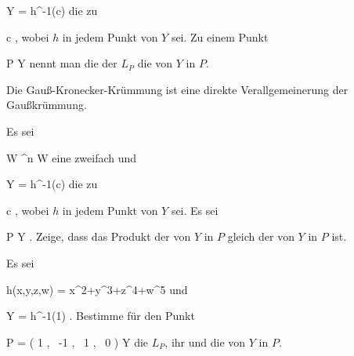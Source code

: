 \mavergleichskette
{\vergleichskette
{ Y
}
{ = }{ h^{-1}(c)
}
{  }{
}
{    }{
}
{   }{
}
}
{}{}{}
die
zu

\mavergleichskette
{\vergleichskette
{ c
}
{ \in }{ \R
}
{  }{
}
{    }{
}
{   }{
}
}
{}{}{,}
wobei $h$ in jedem Punkt von $Y$
sei. Zu einem Punkt

\mavergleichskette
{\vergleichskette
{ P
}
{ \in }{ Y
}
{  }{
}
{    }{
}
{   }{
}
}
{}{}{}
nennt man die
der
$L_P$ die
von $Y$ in $P$.

Die Gauß-Kronecker-Krümmung ist eine direkte Verallgemeinerung der Gaußkrümmung.

{}
{

Es sei

\mavergleichskette
{\vergleichskette
{ W
}
{ \subseteq }{ \R^n
}
{  }{
}
{    }{
}
{   }{
}
}
{}{}{}
 { W } { \R
} {}
eine zweifach
und

\mavergleichskette
{\vergleichskette
{ Y
}
{ = }{ h^{-1}(c)
}
{  }{
}
{    }{
}
{   }{
}
}
{}{}{}
die
zu

\mavergleichskette
{\vergleichskette
{ c
}
{ \in }{ \R
}
{  }{
}
{    }{
}
{   }{
}
}
{}{}{,}
wobei $h$ in jedem Punkt von $Y$
sei. Es sei

\mavergleichskette
{\vergleichskette
{ P
}
{ \in }{ Y
}
{  }{
}
{    }{
}
{   }{
}
}
{}{}{.}
Zeige, dass das Produkt der
von $Y$ in $P$ gleich der
von $Y$ in $P$ ist.

}
{} {}

{}
{

Es sei

\mavergleichskettedisp
{\vergleichskette
{ h(x,y,z,w)
}
{ =} { x^2+y^3+z^4+w^5
}
{ } {
}
{ } {
}
{ } {
}
}
{}{}{}
und

\mavergleichskette
{\vergleichskette
{ Y
}
{ = }{ h^{-1}(1)
}
{  }{
}
{    }{
}
{   }{
}
}
{}{}{.}
Bestimme für den Punkt

\mavergleichskettedisp
{\vergleichskette
{ P
}
{ =} { \left(  1   , \,   -1  , \,   1 , \,   0                \right)
}
{ \in} { Y
}
{ } {
}
{ } {
}
}
{}{}{}
die
$L_P$, ihr
und die
von $Y$ in $P$.

}
{} {}

